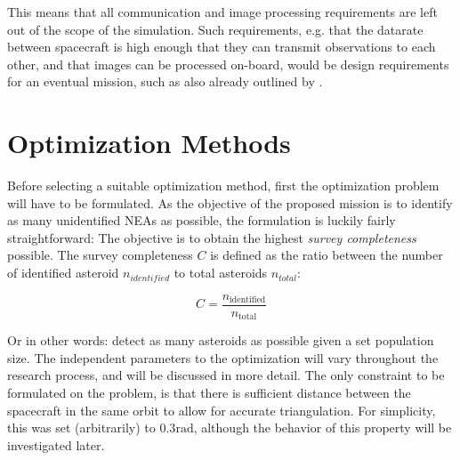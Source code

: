 This means that all communication and image processing requirements are left out of the scope of the simulation. Such requirements, e.g. that the datarate between spacecraft is high enough that they can transmit observations to each other, and that images can be processed on-board, would be design requirements for an eventual mission, such as also already outlined by \cite{2017NEOSDT}.

\section{Optimization Methods}
\label{sec:methodologyoptimization}
Before selecting a suitable optimization method, first the optimization problem will have to be formulated. As the objective of the proposed mission is to identify as many unidentified NEAs as possible, the formulation is luckily fairly straightforward: The objective is to obtain the highest \textit{survey completeness} possible. The survey completeness $C$ is defined as the ratio between the number of identified asteroid $n_{identified}$ to total asteroids $n_{total}$:

\begin{equation}
 C = \frac{n_{\mathrm{identified}}}{n_{\mathrm{total}}}
\end{equation}

Or in other words: detect as many asteroids as possible given a set population size. The independent parameters to the optimization will vary throughout the research process, and will be discussed in more detail. The only constraint to be formulated on the problem, is that there is sufficient distance between the spacecraft in the same orbit to allow for accurate triangulation. For simplicity, this was set (arbitrarily) to $0.3\mathrm{rad}$, although the behavior of this property will be investigated later.

